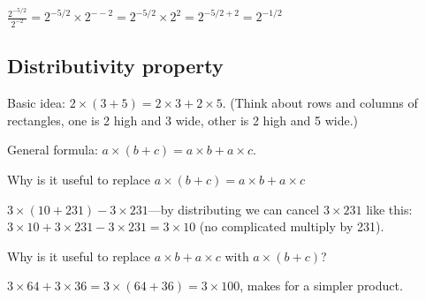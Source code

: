 \documentclass[fullpage,twocolumn]{article}
\begin{document}
$\frac{2^{-5/2}}{2^{-2}} = 2^{-5/2} \times {2^{- -2}} = 2^{-5/2} \times {2^{2}} = 2^{-5/2 + 2} = 2^{-1/2}$


\subsection{Distributivity property}

Basic idea: $2 \times ( 3 + 5 ) = 2 \times 3 + 2 \times 5$. (Think about rows and columns of rectangles, one is 2 high and 3 wide, other is 2 high and 5 wide.)

General formula: $a \times ( b + c) = a \times b + a \times c$.

Why is it useful to  replace $a \times ( b + c) = a \times b + a \times c$

$3 \times ( 10 + 231 ) - 3 \times 231$---by distributing we can cancel $3 \times 231$ like this:
$3 \times 10 + 3 \times 231 - 3 \times 231 = 3 \times 10$ (no complicated multiply by 231).

Why is it useful to replace $a \times b + a \times c$ with $a \times ( b + c)$?

$ 3 \times 64 + 3 \times 36 = 3 \times (64 + 36) = 3 \times 100$, makes for a simpler product.
\end{document}
